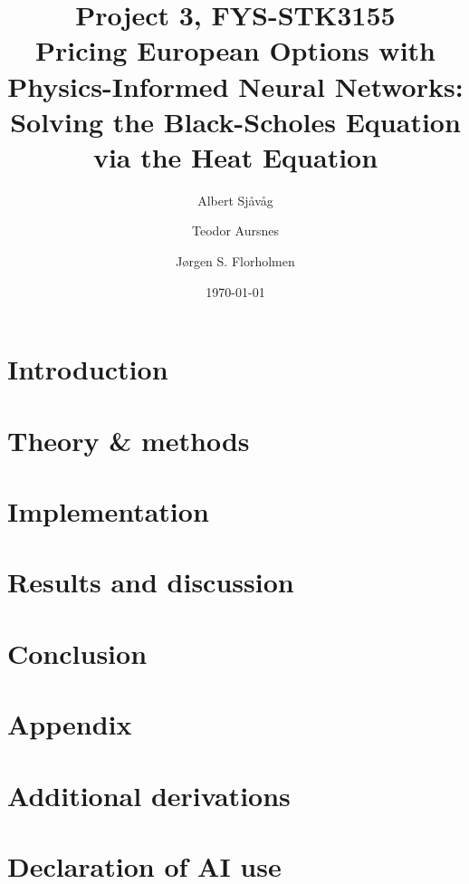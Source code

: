 \documentclass[
    aps,
    prd,
    reprint,
    amsmath,
    amssymb,
    nofootinbib,
    superscriptaddress
]{revtex4-2}
\begin{document}
\title{Project 3, FYS-STK3155\\
Pricing European Options with Physics-Informed Neural Networks: Solving the Black-Scholes Equation via the Heat Equation}

\author{Albert Sjåvåg}
\author{Teodor Aursnes}
\author{Jørgen S. Florholmen}

\date{\today}


\begin{abstract}

\end{abstract}

\maketitle

\section{{Introduction}}
%

\section{Theory \& methods}\label{sec:theory}
    
    
\section{Implementation}\label{sec:implementation}
    

\section{Results and discussion}\label{sec:results}
    
    
    
\section{Conclusion}\label{sec:conclusion}




\appendix
\section*{Appendix}
\section{Additional derivations}
    

\section{Declaration of AI use}
    
    
\end{document}
